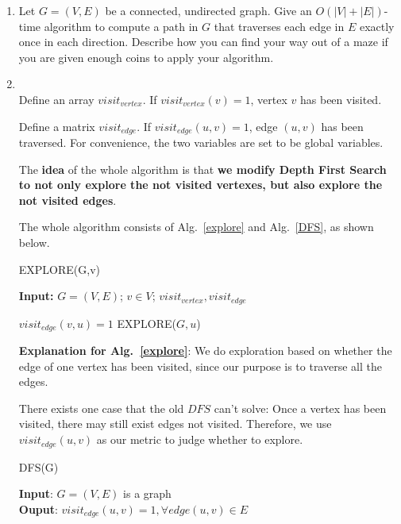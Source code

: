 \documentclass[12pt,a4paper]{article}
\makeatletter
\newtheorem*{solution}{Solution}
\theoremstyle{definition}
\renewenvironment{solution}[1][Solution] {\par\pushQED{\qed}\normalfont\topsep6\p@\@plus6\p@\relax\trivlist\item[\hskip\labelsep\bfseries#1\@addpunct{.}]\ignorespaces}{\popQED\endtrivlist\@endpefalse} \makeatother
\makeatother
\begin{document}
\begin{enumerate}
\begin{enumerate}
	\end{enumerate}
	
    \item Let $G=(V,E)$ be a connected, undirected graph. Give an $O(|V|+|E|)$-time algorithm
    to compute a path in $G$ that traverses each edge in $E$ exactly once in each direction. Describe how you can find your way out of a maze if you are given enough coins to apply your algorithm.
    
    \begin{solution}
    ~\\
    Define an array $visit_{vertex}$. If $visit_{vertex}(v)=1$, vertex $v$ has been visited.
    
    Define a matrix $visit_{edge}$. If $visit_{edge}(u,v)=1$, edge $(u,v)$ has been traversed. 
    For convenience, the two variables are set to be global variables.
    
    The \textbf{idea} of the whole algorithm is that \textbf{we modify Depth First Search to not only explore the not visited vertexes, but also explore the not visited edges}.
    
The whole algorithm consists of Alg.~\ref{explore} and Alg.~\ref{DFS}, as shown below.
    
    
    \begin{algorithm}
    \caption{EXPLORE(G,v)}
    \label{explore}
    \textbf{Input:} $G=(V,E)$; $v\in V$; $visit_{vertex}, visit_{edge}$\;
    
    {
        \Return \;
    }
    {
    {
        $visit_{edge}(v,u)=1$\;
        EXPLORE($G,u$)\;
    }
    }
    
    \end{algorithm}
    
    \textbf{Explanation for Alg.~\ref{explore}}: We do exploration based on whether the edge of one vertex has been visited, since our purpose is to traverse all the edges. 
    
    There exists one case that the old $DFS$ can't solve: Once a vertex has been visited, there may still exist edges not visited. Therefore, we use $visit_{edge}(u,v)$ as our metric to judge whether to explore.
    
    \begin{algorithm}
    \caption{DFS(G)}
    \label{DFS}
    \textbf{Input}: $G=(V,E)$ is a graph\\
    \textbf{Ouput}: $visit_{edge}(u,v)=1, \forall edge(u,v) \in E$\\
    \end{algorithm}
    \end{solution}
    

\end{enumerate}
\end{document}

